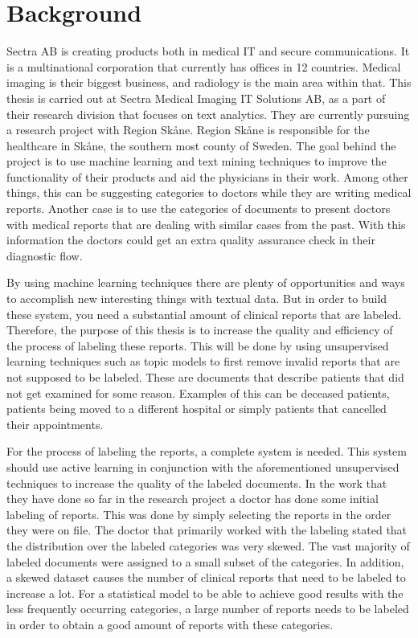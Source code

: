 \chapter{Background}
\label{cha:background}

Sectra AB is creating products both in medical IT and secure communications.
It is a multinational corporation that currently has offices in 12 countries.
Medical imaging is their biggest business, and radiology is the main area within that.
This thesis is carried out at Sectra Medical Imaging IT Solutions AB, as a part of their research division that focuses on text analytics.
They are currently pursuing a research project with Region Skåne.
Region Skåne is responsible for the healthcare in Skåne, the southern most county of Sweden.
The goal behind the project is to use machine learning and text mining techniques to improve the functionality of their products and aid the physicians in their work.
Among other things, this can be suggesting categories to doctors while they are writing medical reports.
Another case is to use the categories of documents to present doctors with medical reports that are dealing with similar cases from the past.
With this information the doctors could get an extra quality assurance check in their diagnostic flow.

By using machine learning techniques there are plenty of opportunities and ways to accomplish new interesting things with textual data.
But in order to build these system, you need a substantial amount of clinical reports that are labeled.
Therefore, the purpose of this thesis is to increase the quality and efficiency of the process of labeling these reports.
This will be done by using unsupervised learning techniques such as topic models to first remove invalid reports that are not supposed to be labeled.
These are documents that describe patients that did not get examined for some reason.
Examples of this can be deceased patients, patients being moved to a different hospital or simply patients that cancelled their appointments.

For the process of labeling the reports, a complete system is needed.
This system should use active learning in conjunction with the aforementioned unsupervised techniques to increase the quality of the labeled documents.
In the work that they have done so far in the research project a doctor has done some initial labeling of reports.
This was done by simply selecting the reports in the order they were on file.
The doctor that primarily worked with the labeling stated that the distribution over the labeled categories was very skewed.
The vast majority of labeled documents were assigned to a small subset of the categories.
In addition, a skewed dataset causes the number of clinical reports that need to be labeled to increase a lot.
For a statistical model to be able to achieve good results with the less frequently occurring categories, a large number of reports needs to be labeled in order to obtain a good amount of reports with these categories.

